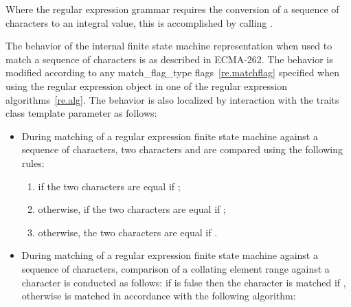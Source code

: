 \pnum
Where the regular expression grammar requires the conversion of a sequence of characters
to an integral value, this is accomplished by calling .

\pnum
{}%
The behavior of the internal finite state machine representation when used to match a
sequence of characters is as described in ECMA-262.
The behavior is modified according
to any match_flag_type flags~\ref{re.matchflag} specified when using the regular expression
object in one of the regular expression algorithms~\ref{re.alg}. The behavior is also
localized by interaction with the traits class template parameter as follows:

\begin{itemize}
\item During matching of a regular expression finite state machine
against a sequence of characters, two characters 
and  are compared using the following rules: 
\begin{enumerate}
\item if  the two characters are equal
if ;
%
%
\item otherwise, if  the
two characters are equal if 
;
%
%
%
\item otherwise, the two characters are equal if .
\end{enumerate}

\item During matching of a regular expression finite state machine
against a sequence of characters, comparison of a collating element
range  against a character  is 
conducted as follows: if  is false then the character  is matched if , otherwise  is matched in 
accordance with the following algorithm:


\end{itemize}
